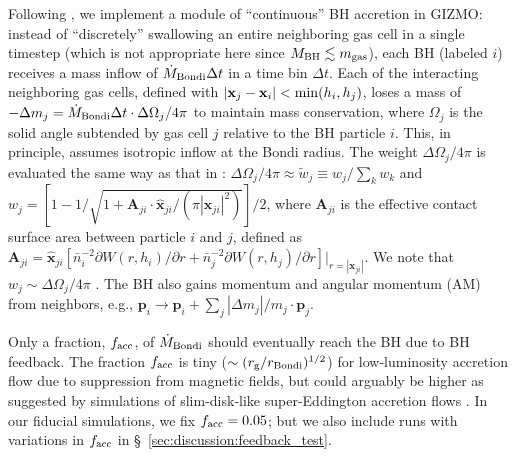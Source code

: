 \documentclass[twocolumn]{aastex631}
\begin{document}
Following \citet{HopkinsWetzelKeres_2018MNRAS.477.1578H}, we implement a module of ``continuous'' BH accretion in {GIZMO}: instead of ``discretely'' swallowing an entire neighboring gas cell in a single timestep \citep{SpringelDiMatteoHernquist_2005MNRAS.361..776S,DiMatteoSpringelHernquist_2005Natur.433..604D} (which is not appropriate here since $M_{\rm BH} \lesssim m_{\rm gas}$), each BH (labeled $i$) receives a mass inflow of $\dot M_{\rm Bondi}\Delta t$ in a time bin $\Delta t$. Each of the interacting neighboring gas cells, defined with $|\mathbf x_j - \mathbf x_i |<{\rm min}(h_i, h_j)$, loses a mass of $-\Delta m_j = \dot M_{\rm Bondi}\Delta t \cdot \Delta \Omega_j /4\pi$ to maintain mass conservation, where $\Omega_j$ is the solid angle subtended by gas cell $j$ relative to the BH particle $i$. This, in principle, assumes isotropic inflow at the Bondi radius. The weight $\Delta \Omega_j /4\pi$ is evaluated the same way as that in \citet{HopkinsWetzelKeres_2018MNRAS.477.1578H}: $\Delta \Omega_j /4\pi\approx \tilde{w}_j \equiv w_j/\sum_k w_k $ and $w_j = [1-1/\sqrt{1+\mathbf{A}_{ji} \cdot \hat{\mathbf{x}}_{ji}/(\pi |\mathbf{x}_{ji}|^2) }]/2$, where $\mathbf{A}_{ji}$ is the effective contact surface area between particle $i$ and $j$, defined as $\mathbf{A}_{ji} = \hat{\mathbf{x}}_{ji} [\bar n_i^{-2} \partial W(r, h_i)/\partial r + \bar n_j^{-2} \partial W(r, h_j)/\partial r ]\vert_{r=|\mathbf{x}_{ji}|}$. We note that $w_j \sim \Delta \Omega_j / 4\pi $ \citep{HopkinsWetzelKeres_2018MNRAS.477.1578H}. The BH also gains momentum and angular momentum (AM) from neighbors, e.g., $\mathbf{p}_i \to \mathbf{p}_i + \sum_j|\Delta m_j|/m_j\cdot \mathbf{p}_j$. 

Only a fraction, $f_{\rm acc}$, of $\dot M_{\rm Bondi}$ should eventually reach the BH due to BH feedback. {The fraction $f_{\rm acc}$ is tiny ($\sim (r_{\rm g}/r_{\rm Bondi})^{1/2}$) for low-luminosity accretion flow \citep{GuoStoneKim_2023ApJ...946...26G,ChoPratherNarayan_2023ApJ...959L..22C} due to suppression from magnetic fields, }but could arguably be higher as suggested by simulations of slim-disk-like super-Eddington accretion flows \citep{JiangStoneDavis_2014ApJ...796..106J,ZhangStoneWhite_2026ApJ..1001..138Z}. In our fiducial simulations, we fix $f_{\rm acc}=0.05$; but we also include runs with variations in $f_{\rm acc}$ in \S~\ref{sec:discussion:feedback_test}.
\end{document}
